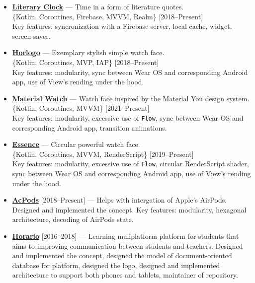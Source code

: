 \documentclass[a4paper]{article}
\begin{document}
\begin{itemize}
		\item \faAndroid \enskip \href{https://github.com/AChep/literaryclock}{\textbf{Literary Clock}} --- Time in a form of literature quotes. \\[0.2em]
		{\footnotesize \{Kotlin, Coroutines, Firebase, MVVM, Realm\} \hfill [2018--Present]} \\[0.2em]
		Key features: syncronization with a Firebase server, local cache, widget, screen saver.  
			
		\item \faAndroid \enskip \href{https://github.com/AChep/horlogo}{\textbf{Horlogo}} --- Exemplary stylish simple watch face. \\[0.2em]
		{\footnotesize \{Kotlin, Coroutines, MVP, IAP\} \hfill [2018--Present]} \\[0.2em]
		Key features: modularity, sync between Wear OS and corresponding Android app, use of View's rending under the hood.   
			
		\item \faAndroid \enskip \href{https://github.com/AChep/materialwatch}{\textbf{Material Watch}} --- Watch face inspired by the Material You design system. \\[0.2em]
		{\footnotesize \{Kotlin, Coroutines, MVVM\} \hfill [2021--Present]} \\[0.2em]
		Key features: modularity, excessive use of \texttt{Flow}, sync between Wear OS and corresponding Android app, transition animations.   
		
		\item \faAndroid \enskip \href{https://github.com/AChep/essence}{\textbf{Essence}} --- Circular powerful watch face. \\[0.2em]
		{\footnotesize \{Kotlin, Coroutines, MVVM, RenderScript\} \hfill [2019--Present]} \\[0.2em]
		Key features: modularity, excessive use of \texttt{Flow}, circular RenderScript shader, sync between Wear OS and corresponding Android app, use of View's rending under the hood.  
		
		\item {\footnotesize \faAndroid \enskip \href{https://github.com/AChep/acpods}{\textbf{AcPods}} [2018--Present] --- Helps with intergation of Apple's AirPods. Designed and implemented the concept. Key features: modularity, hexagonal architecture, decoding of AirPods state.}   
		
		\item {\footnotesize \faAndroid \enskip \href{http://artemchep.com/horario/}{\textbf{Horario}} [2016--2018] --- Learning muliplatform platform for students that aims to improving communication between students and teachers. Designed and implemented the concept, designed the model of document-oriented database for platform, designed the logo, designed and implemented architecture to support both phones and tablets, maintainer of repository.} 
		

\end{itemize}
\end{document}
